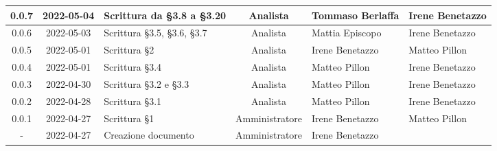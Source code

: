 \begin{center}
\begin{longtable}{ |c|c|p{8em}|c|m{5em}|m{5em}| }
	\hline
    0.0.7 & 2022-05-04 & Scrittura \newline da §3.8 a §3.20 & Analista & Tommaso \newline Berlaffa & Irene \newline Benetazzo\\
    \hline
    0.0.6 & 2022-05-03 & Scrittura \newline §3.5, §3.6, §3.7 & Analista & Mattia \newline Episcopo & Irene \newline Benetazzo\\
	\hline
    0.0.5 & 2022-05-01 & Scrittura §2 & Analista & Irene \newline Benetazzo & Matteo \newline Pillon\\
	\hline
    0.0.4 & 2022-05-01 & Scrittura §3.4 & Analista & Matteo \newline Pillon & Irene \newline Benetazzo\\
	\hline
    0.0.3 & 2022-04-30 & Scrittura \newline §3.2 e §3.3 & Analista & Matteo \newline Pillon & Irene \newline Benetazzo\\
	\hline
    0.0.2 & 2022-04-28 & Scrittura §3.1 & Analista & Matteo \newline Pillon & Irene \newline Benetazzo\\
	\hline
	0.0.1 & 2022-04-27 & Scrittura §1 & Amministratore & Irene \newline Benetazzo & Matteo \newline Pillon\\
	\hline
	- & 2022-04-27 & Creazione \newline documento & Amministratore & Irene \newline Benetazzo & \\
	\hline
	\end{longtable}
	\end{center}
	\newpage